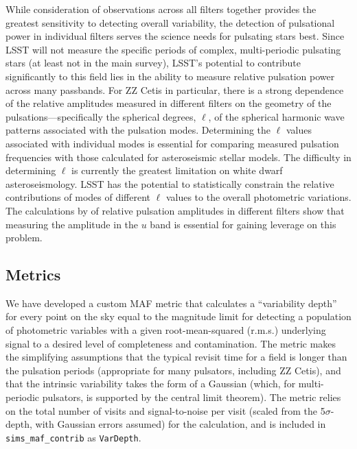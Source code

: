 While consideration of observations across all filters together provides
the greatest sensitivity to detecting overall variability, the detection
of pulsational power in individual filters serves the science needs for
pulsating stars best.  Since LSST will not measure the specific periods
of complex, multi-periodic pulsating stars (at least not in the main
survey), LSST's potential to contribute significantly to this field lies
in the ability to measure relative pulsation power across many
passbands.  For ZZ Cetis in particular, there is a strong dependence of
the relative amplitudes measured in different filters on the geometry of
the pulsations---specifically the spherical degrees, $\ell$, of the
spherical harmonic wave patterns associated with the pulsation modes.
Determining the $\ell$ values associated with individual modes is
essential for comparing measured pulsation frequencies with those
calculated for asteroseismic stellar models.  The difficulty in
determining $\ell$ is currently the greatest limitation on white dwarf
asteroseismology. LSST has the potential to statistically constrain the
relative contributions of modes of different $\ell$ values to the
overall photometric variations.  The calculations by
\citet{1995ApJS...96..545B} of relative pulsation amplitudes in
different filters show that measuring the amplitude in the $u$ band is
essential for gaining leverage on this problem.


\subsection{Metrics}
\label{sec:\secname:metrics}

We have developed a custom MAF metric that calculates a ``variability
depth'' for every point on the sky equal to the magnitude limit for
detecting a population of photometric variables with a given
root-mean-squared (r.m.s.) underlying signal to a desired level of
completeness and contamination.  The metric makes the simplifying
assumptions that the typical revisit time for a field is longer than the
pulsation periods (appropriate for many pulsators, including ZZ Cetis),
and that the intrinsic variability takes the form of a Gaussian (which,
for multi-periodic pulsators, is supported by the central limit
theorem).  The metric relies on the total number of visits and
signal-to-noise per visit (scaled from the 5$\sigma$-depth, with
Gaussian errors assumed) for the calculation, and is included in {\tt
sims\_maf\_contrib} as {\tt VarDepth}.

